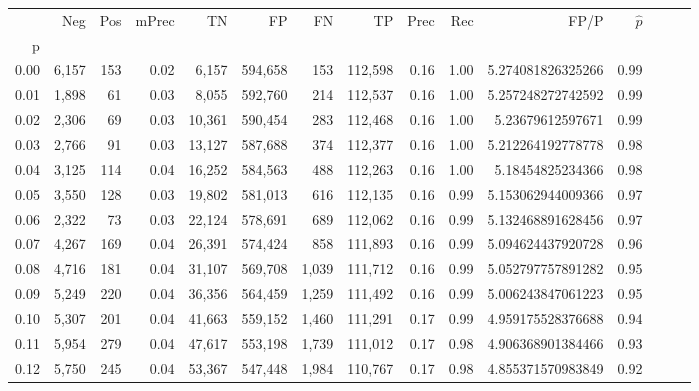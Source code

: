 \begin{tabular}{rrrrrrrrrrrrrrr}
\toprule
{} &     Neg &    Pos & mPrec &       TN &       FP &       FN &       TP &  Prec &   Rec &                  FP/P & $\hat{p}$ \\
p    &         &        &       &          &          &          &          &       &       &                       &           \\
\midrule
0.00 &   6,157 &    153 &  0.02 &    6,157 &  594,658 &      153 &  112,598 &  0.16 &  1.00 &     5.274081826325266 &      0.99 \\
0.01 &   1,898 &     61 &  0.03 &    8,055 &  592,760 &      214 &  112,537 &  0.16 &  1.00 &     5.257248272742592 &      0.99 \\
0.02 &   2,306 &     69 &  0.03 &   10,361 &  590,454 &      283 &  112,468 &  0.16 &  1.00 &      5.23679612597671 &      0.99 \\
0.03 &   2,766 &     91 &  0.03 &   13,127 &  587,688 &      374 &  112,377 &  0.16 &  1.00 &     5.212264192778778 &      0.98 \\
0.04 &   3,125 &    114 &  0.04 &   16,252 &  584,563 &      488 &  112,263 &  0.16 &  1.00 &      5.18454825234366 &      0.98 \\
0.05 &   3,550 &    128 &  0.03 &   19,802 &  581,013 &      616 &  112,135 &  0.16 &  0.99 &     5.153062944009366 &      0.97 \\
0.06 &   2,322 &     73 &  0.03 &   22,124 &  578,691 &      689 &  112,062 &  0.16 &  0.99 &     5.132468891628456 &      0.97 \\
0.07 &   4,267 &    169 &  0.04 &   26,391 &  574,424 &      858 &  111,893 &  0.16 &  0.99 &     5.094624437920728 &      0.96 \\
0.08 &   4,716 &    181 &  0.04 &   31,107 &  569,708 &    1,039 &  111,712 &  0.16 &  0.99 &     5.052797757891282 &      0.95 \\
0.09 &   5,249 &    220 &  0.04 &   36,356 &  564,459 &    1,259 &  111,492 &  0.16 &  0.99 &     5.006243847061223 &      0.95 \\
0.10 &   5,307 &    201 &  0.04 &   41,663 &  559,152 &    1,460 &  111,291 &  0.17 &  0.99 &     4.959175528376688 &      0.94 \\
0.11 &   5,954 &    279 &  0.04 &   47,617 &  553,198 &    1,739 &  111,012 &  0.17 &  0.98 &     4.906368901384466 &      0.93 \\
0.12 &   5,750 &    245 &  0.04 &   53,367 &  547,448 &    1,984 &  110,767 &  0.17 &  0.98 &     4.855371570983849 &      0.92 \\

\end{tabular}
